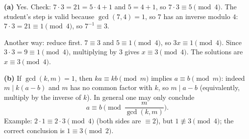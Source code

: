 \textbf{(a)} Yes. Check: $7\cdot3=21=5\cdot4+1$ and $5=4+1$, so $7\cdot3\equiv5\pmod4$. The student's step is valid because $\gcd(7,4)=1$, so $7$ has an inverse modulo $4$: $7\cdot3=21\equiv1\pmod4$, so $7^{-1}\equiv3$.

Another way: reduce first. $7\equiv3$ and $5\equiv1\pmod4$, so $3x\equiv1\pmod4$. Since $3\cdot3=9\equiv1\pmod4$, multiplying by $3$ gives $x\equiv3\pmod4$. The solutions are $\boxed{x\equiv3\pmod4}$.

\textbf{(b)} If $\gcd(k,m)=1$, then $ka\equiv kb\pmod m$ implies $a\equiv b\pmod m$: indeed $m\mid k(a-b)$ and $m$ has no common factor with $k$, so $m\mid a-b$ (equivalently, multiply by the inverse of $k$). In general one may only conclude
\[a\equiv b\pmod{\dfrac{m}{\gcd(k,m)}}.\]
Example: $2\cdot1\equiv2\cdot3\pmod4$ (both sides are $\equiv2$), but $1\not\equiv3\pmod4$; the correct conclusion is $1\equiv3\pmod2$.

